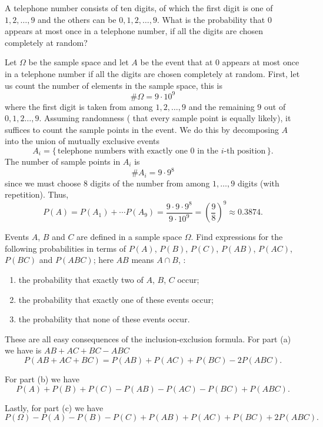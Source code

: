\begin{problem}
  A telephone number consists of ten digits, of which the first digit is
  one of \(1,2,\dotsc,9\) and the others can be \(0,1,2,\dotsc,9\). What is
  the probability that \(0\) appears at most once in a telephone number, if
  all the digits are chosen completely at random?
\end{problem}
\begin{solution}
  Let \(\Omega\) be the sample space and let \(A\) be the event that at
  \(0\) appears at most once in a telephone number if all the digits are
  chosen completely at random. First, let us count the number of elements
  in the sample space, this is
  \[
    \#\Omega=9\cdot 10^9
  \]
  where the first digit is taken from among \(1,2,\dotsc,9\) and the
  remaining \(9\) out of \(0,1,2\dotsc,9\). Assuming randomness (\ie{} that
  every sample point is equally likely), it suffices to count the sample
  points in the event. We do this by decomposing \(A\) into the union of
  mutually exclusive events
  \[
    A_i=\bigl\{\,\text{telephone numbers with exactly one \(0\) in the
      \(i\)-th position}\,\bigr\}.
  \]
  The number of sample points in \(A_i\) is
  \[
    \# A_i=9\cdot 9^8
  \]
  since we must choose \(8\) digits of the number from among \(1,\dotsc,9\)
  digits (with repetition). Thus,
  \[
    P(A)=%
    P(A_1)+\dotsm P(A_9)=%
    \frac{9\cdot 9\cdot 9^8}{9\cdot 10^9}=%
    \left(\frac{9}{8}\right)^9\approx 0.3874.
  \]
\end{solution}
\newpage

\begin{problem}
  Events \(A\), \(B\) and \(C\) are defined in a sample space
  \(\Omega\). Find expressions for the following probabilities in terms of
  \(P(A)\), \(P(B)\), \(P(C)\), \(P(AB)\), \(P(AC)\), \(P(BC)\) and
  \(P(ABC)\); here \(AB\) means \(A\cap B\), \etc{}:
  \begin{enumerate}[label=(\alph*)]
  \item the probability that exactly two of \(A\), \(B\), \(C\) occur;
  \item the probability that exactly one of these events occur;
  \item the probability that none of these events occur.
  \end{enumerate}
\end{problem}
\begin{solution}
  These are all easy consequences of the inclusion-exclusion formula. For
  part (a) we have is \(AB+AC+BC-ABC\)
  \[
    P(AB+AC+BC)=P(AB)+P(AC)+P(BC)-2P(ABC).
  \]

  For part (b) we have
  \[
    P(A)+P(B)+P(C)-P(AB)-P(AC)-P(BC)+P(ABC).
  \]

  Lastly, for part (c) we have
  \[
    P(\Omega)-P(A)-P(B)-P(C)+P(AB)+P(AC)+P(BC)+2P(ABC).
  \]
\end{solution}
\newpage

